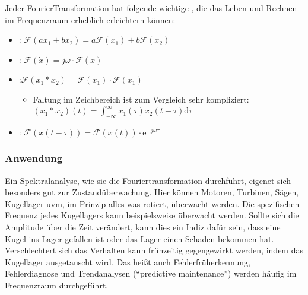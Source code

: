 \documentclass[letterpaper,10pt,english]{jupyterBook}
\begin{document}
\sphinxAtStartPar
Jeder Fourier\sphinxhyphen{}Transformation hat folgende wichtige , die das Leben und Rechnen im Frequenzraum erheblich erleichtern können:
\begin{itemize}
\item {} 
\sphinxAtStartPar
{}: \(\mathcal F(ax_1 + bx_2) = a\mathcal F(x_1)+ b \mathcal F(x_2)\)

\item {} 
\sphinxAtStartPar
{}: \(\mathcal F(\dot x) = j\omega \cdot \mathcal F(x)\)

\item {} 
\sphinxAtStartPar
{}:\( \mathcal F(x_1*x_2) = \mathcal F(x_1) \cdot \mathcal F(x_1)\)
\begin{itemize}
\item {} 
\sphinxAtStartPar
Faltung im Zeichbereich ist zum Vergleich sehr kompliziert: \((x_1 \ast x_2)(t) = \int_{-\infty}^{\infty} x_1(\tau)x_2(t-\tau) \mathrm{d}\tau\)

\end{itemize}

\item {} 
\sphinxAtStartPar
{}: \(\mathcal F(x(t-\tau)) = \mathcal F(x(t)) \cdot \mathrm e^{-j\omega \tau}\)

\end{itemize}


\subsubsection{Anwendung}
\label{\detokenize{content/3_FourierAnalyse:anwendung}}
\sphinxAtStartPar


\sphinxAtStartPar
Ein Spektralanalyse, wie sie die Fouriertransformation durchführt, eigenet sich besonders gut zur Zustandüberwachung. Hier können Motoren, Turbinen, Sägen, Kugellager uvm, im Prinzip alles was rotiert, überwacht werden. Die spezifischen Frequenz jedes Kugellagers kann beispielsweise überwacht werden. Sollte sich die Amplitude über die Zeit verändert, kann dies ein Indiz dafür sein, dass eine Kugel ins Lager gefallen ist oder das Lager einen Schaden bekommen hat. Verschlechtert sich das Verhalten kann frühzeitig gegengewirkt werden, indem das Kugellager ausgetauscht wird. Das heißt auch Fehlerfrüherkennung, Fehlerdiagnose und Trendanalysen (“predictive maintenance”) werden häufig im Frequenzraum durchgeführt.
\end{document}
